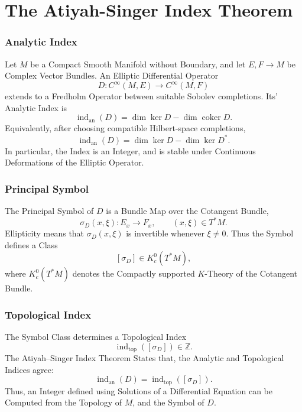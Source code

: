 \documentclass[a4paper, 10pt, onepage]{elegantbook}
\begin{document}
{\chapter{The Atiyah-Singer Index Theorem}
\label{ch:Atiyah-Singer Index Theorem}

\subsection{Analytic Index}

Let \(M\) be a Compact Smooth Manifold without Boundary, and let \(E,F\to M\) be Complex Vector Bundles. An Elliptic 
Differential Operator
\[
D:C^\infty(M,E)\longrightarrow C^\infty(M,F)
\]
extends to a Fredholm Operator between suitable Sobolev completions. Its' Analytic Index is
\begin{equation}
\operatorname{ind}_{\mathrm{an}}(D)
=
\dim\ker D-\dim\operatorname{coker}D.
\end{equation}
Equivalently, after choosing compatible Hilbert-space completions,
\[
\operatorname{ind}_{\mathrm{an}}(D)
=
\dim\ker D-\dim\ker D^*.
\]
In particular, the Index is an Integer, and is stable under Continuous Deformations of the Elliptic Operator.

\subsection{Principal Symbol}

The Principal Symbol of \(D\) is a Bundle Map over the Cotangent Bundle,
\[
\sigma_D(x,\xi):E_x\longrightarrow F_x,
\qquad (x,\xi)\in T^*M.
\]
Ellipticity means that \(\sigma_D(x,\xi)\) is invertible whenever \(\xi\ne 0\). Thus the Symbol defines a Class
\[
[\sigma_D]\in K_c^0(T^*M),
\]
where \(K_c^0(T^*M)\) denotes the Compactly supported \(K\)-Theory of the Cotangent Bundle.

\subsection{Topological Index}

The Symbol Class determines a Topological Index
\[
\operatorname{ind}_{\mathrm{top}}([\sigma_D])\in\mathbb Z.
\]
The Atiyah--Singer Index Theorem States that, the Analytic and Topological Indices agree:
\begin{equation}
\boxed{
\operatorname{ind}_{\mathrm{an}}(D)
=
\operatorname{ind}_{\mathrm{top}}([\sigma_D]).
}
\end{equation}
Thus, an Integer defined using Solutions of a Differential Equation
can be Computed from the Topology of \(M\), and the Symbol of \(D\).

}
\end{document}
